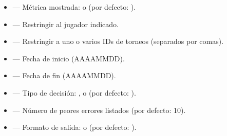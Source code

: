 \documentclass[letterpaper,10pt,spanish]{sphinxmanual}
\begin{document}
\sphinxAtStartPar
{}
\begin{itemize}
\item {} 
\sphinxAtStartPar
{} — Métrica mostrada:  o  (por defecto: ).

\item {} 
\sphinxAtStartPar
{} — Restringir al jugador indicado.

\item {} 
\sphinxAtStartPar
{} — Restringir a uno o varios IDs de torneos (separados por comas).

\item {} 
\sphinxAtStartPar
{} — Fecha de inicio (AAAA\sphinxhyphen{}MM\sphinxhyphen{}DD).

\item {} 
\sphinxAtStartPar
{} — Fecha de fin (AAAA\sphinxhyphen{}MM\sphinxhyphen{}DD).

\item {} 
\sphinxAtStartPar
{} — Tipo de decisión: ,  o  (por defecto: ).

\item {} 
\sphinxAtStartPar
{} — Número de peores errores listados (por defecto: 10).

\item {} 
\sphinxAtStartPar
{} — Formato de salida:  o  (por defecto: ).

\end{itemize}

\sphinxAtStartPar
{}
\end{document}
